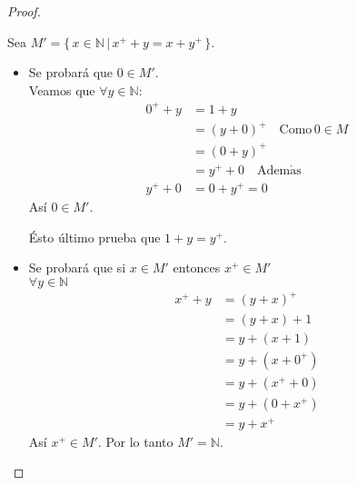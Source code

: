 \begin{proof}
\begin{enumerate}
\begin{itemize}
            Sea $M' = \{ \, x \in \mathbb{N} \, | \, x^+ + y = x + y^+ \, \}$. \\
            \begin{itemize}
                \item Se probará que $0 \in M'$. \\
                    Veamos que $\forall y \in \mathbb{N}$:
                    \begin{align*}
                        0^+ + y &= 1 + y \\
                                &= (y + 0)^+ \quad \mathrm{Como}\, 0 \in M\\
                                &= (0 + y)^+\\
                                &=  y^+ + 0 \quad \mathrm{Adem\acute{a}s}\\
                        y^+ + 0 &=  0 + y^+ = 0
                    \end{align*}
                    Así $0 \in M'$.
    \begin{remark} Ésto último prueba que $1 + y = y^+$.
    \end{remark}
                    \item Se probará que si $x \in M'$ entonces $x^+ \in M'$ \\
                        $\forall y \in \mathbb{N}$
                        \begin{align*}
                            x^+ + y &= (y + x)^+ \\
                                    &= (y + x) + 1 \\
                                    &= y + (x + 1) \\
                                    &= y + (x + 0^+) \\
                                    &= y + (x^+ + 0) \\
                                    &= y + (0 + x^+) \\
                                    &= y + x^+
                        \end{align*}
                        Así $x^+ \in M'$.
                        Por lo tanto $M' = \mathbb{N}$.
            \end{itemize}


\end{itemize}
\end{enumerate}
\end{proof}
